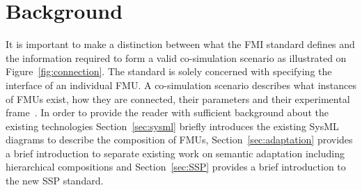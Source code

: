\section{Background}\label{sec:background}

It is important to make a distinction between what the FMI standard defines and the information required to form a valid co-simulation scenario as illustrated on Figure~\ref{fig:connection}. 
The standard is solely concerned with specifying the interface of an individual FMU.
A co-simulation scenario describes what instances of FMUs exist, how they are connected, their parameters and their experimental frame~\cite{Gomes&18}. In order to provide the reader with sufficient background about the existing technologies Section~\ref{sec:sysml} briefly introduces the existing SysML diagrams to describe the composition of FMUs, Section~\ref{sec:adaptation} provides a brief introduction to separate existing work on semantic adaptation including hierarchical compositions and Section~\ref{sec:SSP} provides a brief introduction to the new SSP standard. 






















